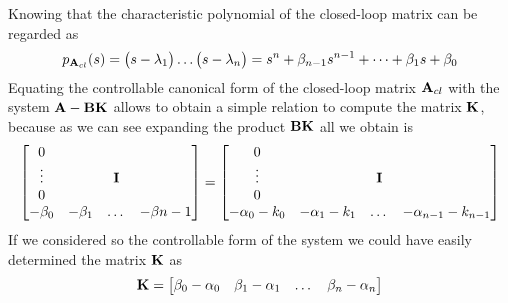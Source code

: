 	Knowing that the characteristic polynomial of the closed-loop matrix can be regarded as 
	\[ p_{\mathbf{A}_{cl}}(s) = \big(s-\lambda_1\big) \dots \big(s-\lambda_n\big) = s^n + \beta_{n-1}s^{n-1} + \dots + \beta_1 s + \beta_0 \]
	Equating the controllable canonical form of the closed-loop matrix $\mathbf{A}_{cl}$ with the system $\mathbf{A} - \mathbf{B} \mathbf{K}$ allows to obtain a simple relation to compute the matrix $\mathbf{K}$, because as we can see expanding the product $\mathbf{B} \mathbf{K}$ all we obtain is 
	\[ \begin{bmatrix}  0 \\ \vdots & & \mathbf{I} \\ 0 \\ - \beta_0 & - \beta_1 & \dots & - \beta{n-1} \end{bmatrix} = \begin{bmatrix}  0 \\ \vdots & & \mathbf{I} \\ 0 \\ - \alpha_0 - k_0 & - \alpha_1 - k_1 & \dots & - \alpha_{n-1} - k_{n-1} \end{bmatrix} \]
	If we considered so the controllable form of the system we could have easily determined the matrix $\mathbf{K}$ as
	\begin{equation}
		\mathbf{K} = \begin{bmatrix} \beta_0 - \alpha_0 & \beta_1 - \alpha_1 & \dots & \beta_n-\alpha_n \end{bmatrix}
	\end{equation}


